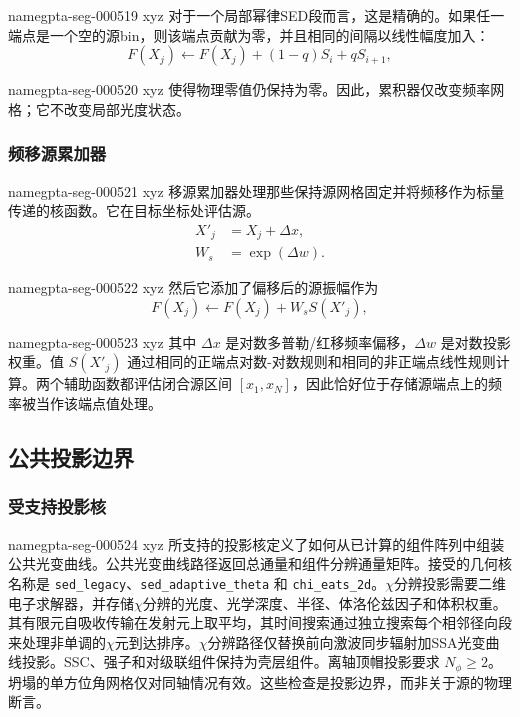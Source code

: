 \documentclass[twocolumn]{aastex702}
\makeatletter
\providecommand{\gptareaderanchor}[1]{\pdfdest name{#1} xyz}%
\providecommand{\gptareaderanchor}[1]{\special{pdf:dest (#1) [ @thispage /XYZ @xpos @ypos null ]}}%
\makeatother
\begin{document}
\gptareaderanchor{gpta-seg-000519}%
对于一个局部幂律SED段而言，这是精确的。如果任一端点是一个空的源bin，则该端点贡献为零，并且相同的间隔以线性幅度加入：
\begin{equation}
F(X_j)\leftarrow F(X_j)+(1-q)S_i+qS_{i+1},
\end{equation}

\gptareaderanchor{gpta-seg-000520}%
使得物理零值仍保持为零。因此，累积器仅改变频率网格；它不改变局部光度状态。

\subsubsection{频移源累加器}


\gptareaderanchor{gpta-seg-000521}%
移源累加器处理那些保持源网格固定并将频移作为标量传递的核函数。它在目标坐标处评估源。
\begin{equation}
\begin{aligned}
X'_j&=X_j+\Delta x,\\
W_s&=\exp(\Delta w).
\end{aligned}
\end{equation}

\gptareaderanchor{gpta-seg-000522}%
然后它添加了偏移后的源振幅作为
\begin{equation}
F(X_j)\leftarrow F(X_j)+W_s S(X'_j),
\end{equation}

\gptareaderanchor{gpta-seg-000523}%
其中 \(\Delta x\) 是对数多普勒/红移频率偏移，\(\Delta w\) 是对数投影权重。值 \(S(X'_j)\) 通过相同的正端点对数-对数规则和相同的非正端点线性规则计算。两个辅助函数都评估闭合源区间 \([x_1,x_N]\)，因此恰好位于存储源端点上的频率被当作该端点值处理。

\subsection{公共投影边界}

\subsubsection{受支持投影核}


\gptareaderanchor{gpta-seg-000524}%
所支持的投影核定义了如何从已计算的组件阵列中组装公共光变曲线。公共光变曲线路径返回总通量和组件分辨通量矩阵。接受的几何核名称是 \texttt{sed\_legacy}、\texttt{sed\_adaptive\_theta} 和 \texttt{chi\_eats\_2d}。\(\chi\)分辨投影需要二维电子求解器，并存储\(\chi\)分辨的光度、光学深度、半径、体洛伦兹因子和体积权重。其有限元自吸收传输在发射元上取平均，其时间搜索通过独立搜索每个相邻径向段来处理非单调的\(\chi\)元到达排序。\(\chi\)分辨路径仅替换前向激波同步辐射加SSA光变曲线投影。SSC、强子和对级联组件保持为壳层组件。离轴顶帽投影要求 \(N_\phi\ge2\)。坍塌的单方位角网格仅对同轴情况有效。这些检查是投影边界，而非关于源的物理断言。
\end{document}
